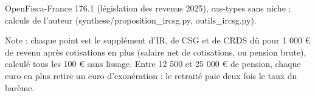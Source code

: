OpenFisca-France 176.1 (législation des revenus 2025), cas-types sans niche ; calculs de l'auteur (synthese/proposition\_ircsg.py, outils\_ircsg.py).\par Note : chaque point est le supplément d'IR, de CSG et de CRDS dû pour 1 000 \euro{} de revenu après cotisations en plus (salaire net de cotisations, ou pension brute), calculé tous les 100 \euro{} sans lissage. Entre 12 500 et 25 000 \euro{} de pension, chaque euro en plus retire un euro d'exonération : le retraité paie deux fois le taux du barème.
